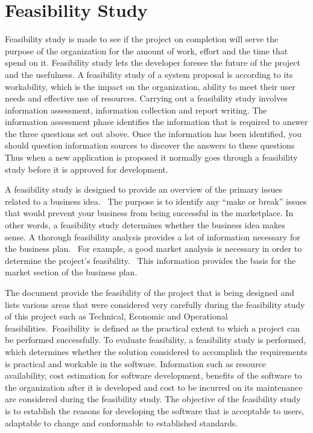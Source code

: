 \section{Feasibility Study}
Feasibility study is made to see if the project on completion will serve the purpose of the organization for the amount of work, effort and the time that spend on it. Feasibility study lets the developer foresee the future of the project and the usefulness. A feasibility study of a system proposal is according to its workability, which is the impact on the organization, ability to meet their user needs and effective use of resources. Carrying out a feasibility study involves information assessment, information collection and report writing. The information assessment phase identifies the information that is required to answer the three questions set out above. Once the information has been identified, you should question information sources to discover the answers to these questions Thus when a new application is proposed it normally goes through a feasibility study before it is approved for development.

A feasibility study is designed to provide an overview of the primary issues related to a business idea.  The purpose is to identify any “make or break” issues that would prevent your business from being successful in the marketplace. In other words, a feasibility study determines whether the business idea makes sense. A thorough feasibility analysis provides a lot of information necessary for the business plan.  For example, a good market analysis is necessary in order to determine the project’s feasibility.  This information provides the basis for the market section of the business plan.

The document provide the feasibility of the project that is being designed and lists various areas that were considered very carefully during the feasibility study of this project such as Technical, Economic and Operational feasibilities. Feasibility is defined as the practical extent to which a project can be performed successfully. To evaluate feasibility, a feasibility study is performed, which determines whether the solution considered to accomplish the requirements is practical and workable in the software. Information such as resource availability, cost estimation for software development, benefits of the software to the organization after it is developed and cost to be incurred on its maintenance are considered during the feasibility study. The objective of the feasibility study is to establish the reasons for developing the software that is acceptable to users, adaptable to change and conformable to established standards.

